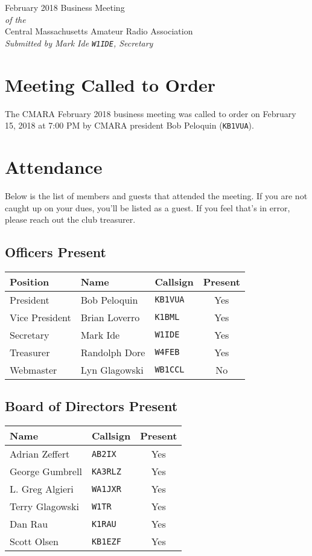 \documentclass[10pt,letterpaper]{article}
\begin{document}
\begin{center}
{\huge February 2018 Business Meeting}\\
\emph{of the}\\
{\Large Central Massachusetts Amateur Radio Association}\\
\emph{Submitted by Mark Ide \texttt{W1IDE}, Secretary}
\end{center}

\section{Meeting Called to Order}
The CMARA February 2018 business meeting was called to order on February 15, 2018 at 7:00 PM by CMARA president Bob Peloquin (\texttt{KB1VUA}).

\section{Attendance}
\noindent
Below is the list of members and guests that attended the meeting. If you are not caught up on your dues, you'll be listed as a guest. If you feel that's in error, please reach out the club treasurer.

\subsection{Officers Present}
\begin{tabular}{|l|l|l|c|}
  \hline
  \textbf{Position} & \textbf{Name}  & \textbf{Callsign} & \textbf{Present} \\ \hline
  President         & Bob Peloquin   & \texttt{KB1VUA}   & Yes \\
  Vice President    & Brian Loverro  & \texttt{K1BML}    & Yes \\
  Secretary         & Mark Ide       & \texttt{W1IDE}    & Yes \\
  Treasurer         & Randolph Dore  & \texttt{W4FEB}    & Yes \\
  Webmaster         & Lyn Glagowski  & \texttt{WB1CCL}   & No  \\
  \hline
\end{tabular}

\subsection{Board of Directors Present}
\begin{tabular}{|l|l|c|}
  \hline
  \textbf{Name}     & \textbf{Callsign} & \textbf{Present} \\ \hline
  Adrian Zeffert  & \texttt{AB2IX}    & Yes \\
  George Gumbrell & \texttt{KA3RLZ}   & Yes \\
  L. Greg Algieri & \texttt{WA1JXR}   & Yes \\
  Terry Glagowski & \texttt{W1TR}     & Yes \\
  Dan Rau         & \texttt{K1RAU}    & Yes \\
  Scott Olsen     & \texttt{KB1EZF}   & Yes \\
  \hline
\end{tabular}
\end{document}
